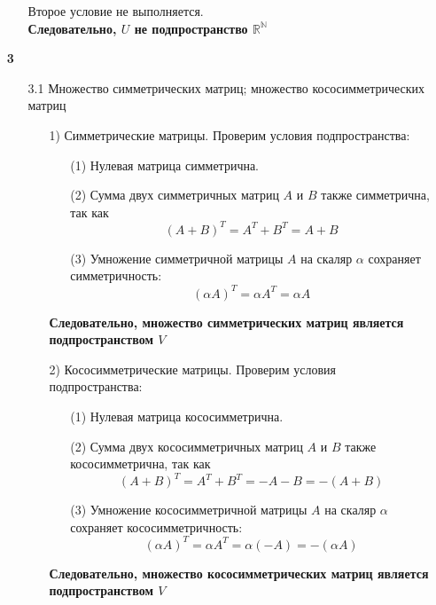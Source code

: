\documentclass[a4paper]{article}
\newcommand{\RR}{\mathbb{R}}
\newcommand{\NN}{\mathbb{N}}
\begin{document}
\begin{enumerate}
\begin{enumerate}
\begin{enumerate}
        \end{enumerate}
        Второе условие не выполняется.\\
        \textbf{Следовательно, $U$ не подпространство $\RR^\NN$}\\
    \end{enumerate}

    \item[\textbf{3}]
    \begin{enumerate}
        \item[3.1]Множество симметрических матриц; множество кососимметрических матриц
        \begin{enumerate}
            \item[1)]Симметрические матрицы. Проверим условия подпространства:
            \begin{enumerate}
                \item[(1)]Нулевая матрица симметрична.
                \item[(2)]Сумма двух симметричных матриц \( A \) и \( B \) также симметрична, так как $$ (A + B)^T = A^T + B^T = A + B $$
                \item[(3)]Умножение симметричной матрицы \( A \) на скаляр \( \alpha \) сохраняет симметричность: $$(\alpha A)^T = \alpha A^T = \alpha A$$ 
            \end{enumerate}
            \textbf{Следовательно, множество симметрических матриц является подпространством $V$}\\

            \item[2)]Кососимметрические матрицы. Проверим условия подпространства:
            \begin{enumerate}
                \item[(1)]Нулевая матрица кососимметрична.
                \item[(2)]Сумма двух кососимметричных матриц \( A \) и \( B \) также кососимметрична, так как $$ (A + B)^T = A^T + B^T = -A - B = -(A + B) $$
                \item[(3)]Умножение кососимметричной матрицы \( A \) на скаляр \( \alpha \) сохраняет кососимметричность:  $$(\alpha A)^T = \alpha A^T = \alpha (-A) = -(\alpha A)$$ 
            \end{enumerate}
            \textbf{Следовательно, множество кососимметрических матриц является подпространством $V$}\\\\
        \end{enumerate}


\end{enumerate}
\end{enumerate}
\end{document}
